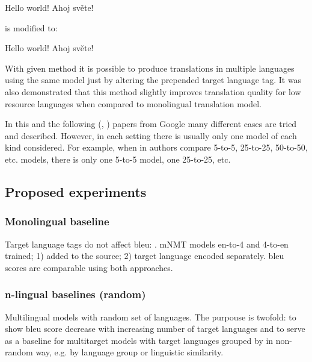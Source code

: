 \begin{displayquote}
Hello world! \to{} Ahoj světe!
\end{displayquote}
is modified to:

\begin{displayquote}
 Hello world! \to{} Ahoj světe!
\end{displayquote}

With given method it is possible to produce translations in multiple languages using the
same model just by altering the prepended target language tag.
It was also demonstrated that this method slightly improves translation quality for 
low resource languages when compared to monolingual translation model.

In this and the following
(, )
papers from Google many different cases are tried and described.
However, in each setting there is usually only one model of each kind considered.
For example, when in  authors compare 5-to-5,
25-to-25, 50-to-50, etc. models, there is only one 5-to-5 model, one 25-to-25, etc.


\subsection{Proposed experiments}
\label{subsection:proposed_experiments}


\subsubsection*{Monolingual baseline}

Target language tags do not affect \acrshort{bleu}: .
mNMT models en-to-4 and 4-to-en trained;
 1)  added to the source;
 2) target language encoded separately.
\acrshort{bleu} scores are comparable using both approaches.

\subsubsection*{n-lingual baselines (random)}

Multilingual models with random set of languages.
The purpouse is twofold: 
to show \acrshort{bleu} score decrease with increasing number of target languages and
to serve as a baseline for multitarget models with target languages grouped by
in non-random way, e.g. by language group or linguistic similarity.

